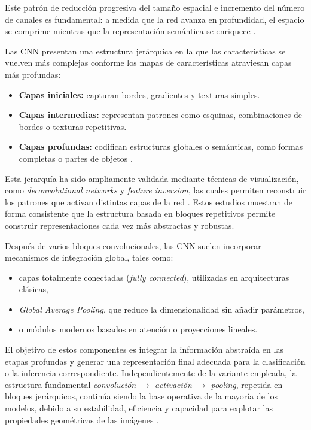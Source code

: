 	Este patrón de reducción progresiva del tamaño espacial e incremento del número de canales es fundamental: a medida que la red avanza en profundidad, el espacio se comprime mientras que la representación semántica se enriquece \cite{iandola2016squeezenet}.
	
	Las CNN presentan una estructura jerárquica en la que las características se vuelven más complejas conforme los mapas de características atraviesan capas más profundas:
	\begin{itemize}
		\item \textbf{Capas iniciales:} capturan bordes, gradientes y texturas simples.
		\item \textbf{Capas intermedias:} representan patrones como esquinas, combinaciones de bordes o texturas repetitivas.
		\item \textbf{Capas profundas:} codifican estructuras globales o semánticas, como formas completas o partes de objetos \cite{zeiler2014}.
	\end{itemize}
	
	Esta jerarquía ha sido ampliamente validada mediante técnicas de visualización, como \textit{deconvolutional networks} y \textit{feature inversion}, las cuales permiten reconstruir los patrones que activan distintas capas de la red \cite{mahendran2015}. Estos estudios muestran de forma consistente que la estructura basada en bloques repetitivos permite construir representaciones cada vez más abstractas y robustas.
	
	Después de varios bloques convolucionales, las CNN suelen incorporar mecanismos de integración global, tales como:
	\begin{itemize}
		\item capas totalmente conectadas (\textit{fully connected}), utilizadas en arquitecturas clásicas,
		\item \textit{Global Average Pooling}, que reduce la dimensionalidad sin añadir parámetros,
		\item o módulos modernos basados en atención o proyecciones lineales.
	\end{itemize}
	
	El objetivo de estos componentes es integrar la información abstraída en las etapas profundas y generar una representación final adecuada para la clasificación o la inferencia correspondiente. Independientemente de la variante empleada, la estructura fundamental \textit{convolución $\rightarrow$ activación $\rightarrow$ pooling}, repetida en bloques jerárquicos, continúa siendo la base operativa de la mayoría de los modelos, debido a su estabilidad, eficiencia y capacidad para explotar las propiedades geométricas de las imágenes \cite{lin2013nin}.
	
